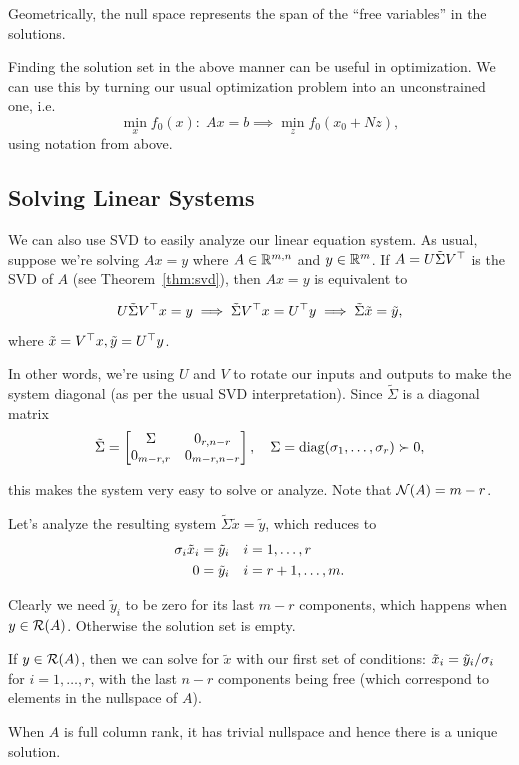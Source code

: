 \documentclass[11 pt]{scrartcl}
\begin{document}
Geometrically, the null space represents the span of the ``free variables'' in the solutions.

Finding the solution set in the above manner can be useful in optimization. We can use this by turning our usual optimization problem into an unconstrained one, i.e. 
\[ \min_x f_0(x) :\; Ax = b \implies \min_z f_0(x_0 + Nz),\] 
using notation from above. 

\subsection{Solving Linear Systems}
We can also use SVD to easily analyze our linear equation system.
As usual, suppose we're solving $Ax = y$ where $A\in \mathbb R^{m,n}$ and $y\in \mathbb R^m$. 
If $A = U\tilde{\Sigma} V^\top$ is the SVD of $A$ (see Theorem~\ref{thm:svd}), then $Ax = y$ is equivalent to 

\[ U\tilde{\Sigma} V^\top x = y \implies \tilde{\Sigma} V^\top x = U^\top y \implies \tilde{\Sigma} \tilde{x} = \tilde{y},\] 
where $\tilde{x} = V^\top x, \tilde{y} = U^\top y$. 

In other words, we're using $U$ and $V$ to rotate our inputs and outputs to make the system diagonal (as per the usual SVD interpretation). 
Since $\tilde{\Sigma}$ is a diagonal matrix 
\[ \tilde{\Sigma} = \begin{bmatrix} \Sigma & 0_{r, n-r} \\ 0_{m-r, r} & 0_{m-r, n-r} \end{bmatrix},\quad \Sigma = \text{diag}(\sigma_1, \dots, \sigma_r) \succ 0,\]

this makes the system very easy to solve or analyze.
Note that $\mathcal N(A) = m-r$. 

Let's analyze the resulting system $\tilde{\Sigma}\tilde{x} = \tilde{y}$, which reduces to 
\begin{align*}
    \sigma_i \tilde{x}_i &= \tilde{y}_i \quad i = 1, \dots, r \\ 
    0 &= \tilde{y}_i \quad i = r+1, \dots, m.
\end{align*}

Clearly we need $\tilde{y}_i$ to be zero for its last $m-r$ components, which happens when $y\in \mathcal R(A)$. 
Otherwise the solution set is empty. 

If $y\in \mathcal R(A)$, then we can solve for $\tilde{x}$ with our first set of conditions: $\tilde{x}_i = \tilde{y}_i/\sigma_i$ for $i = 1, \dots, r$, with the last $n-r$ components being free (which correspond to elements in the nullspace of $A$).

When $A$ is full column rank, it has trivial nullspace and hence there is a unique solution. 
\end{document}
